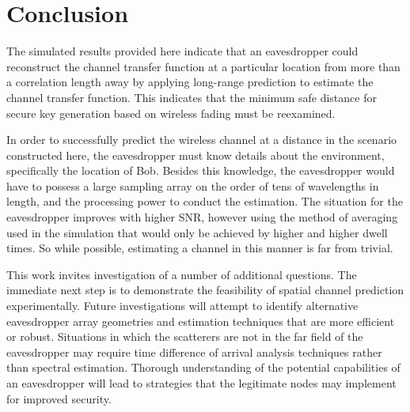 \documentclass{allertonproc}
\begin{document}
\FloatBarrier
\section{Conclusion}

The simulated results provided here indicate that an eavesdropper could reconstruct the channel transfer function at a particular location from more than a correlation length away by applying long-range prediction to estimate the channel transfer function.  This indicates that the minimum safe distance for secure key generation based on wireless fading must be reexamined.

In order to successfully predict the wireless channel at a distance in the scenario constructed here, the eavesdropper must know details about the environment, specifically the location of Bob. Besides this knowledge, the eavesdropper would have to possess a large sampling array on the order of tens of wavelengths in length, and the processing power to conduct the estimation. The situation for the eavesdropper improves with higher SNR, however using the method of averaging used in the simulation that would only be achieved by higher and higher dwell times. So while possible, estimating a channel in this manner is far from trivial. %

This work invites investigation of a number of additional questions. The immediate next step is to demonstrate the feasibility of spatial channel prediction experimentally.  Future investigations will attempt to identify alternative eavesdropper array geometries and estimation techniques that are more efficient or robust.  Situations in which the scatterers are not in the far field of the eavesdropper may require time difference of arrival analysis techniques rather than spectral estimation.   Thorough understanding of the potential capabilities of an eavesdropper will lead to strategies that the legitimate nodes may implement for improved security.


{}
\end{document}
